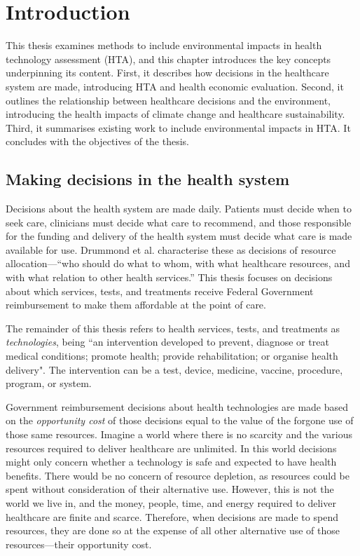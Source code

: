 \chapter{Introduction}
\label{ch-1}
\begin{refsection}
This thesis examines methods to include environmental impacts in health technology assessment (HTA), and this chapter introduces the key concepts underpinning its content. First, it describes how decisions in the healthcare system are made, introducing HTA and health economic evaluation. Second, it outlines the relationship between healthcare decisions and the environment, introducing the health impacts of climate change and healthcare sustainability. Third, it summarises existing work to include environmental impacts in HTA. It concludes with the objectives of the thesis.

\section{Making decisions in the health system}
Decisions about the health system are made daily. Patients must decide when to seek care, clinicians must decide what care to recommend, and those responsible for the funding and delivery of the health system must decide what care is made available for use. Drummond et al. characterise these as decisions of resource allocation—“who should do what to whom, with what healthcare resources, and with what relation to other health services.”\cite{drummond_methods_2015} This thesis focuses on decisions about which services, tests, and treatments receive Federal Government reimbursement to make them affordable at the point of care.

The remainder of this thesis refers to health services, tests, and treatments as \textit{technologies}, being “an intervention developed to prevent, diagnose or treat medical conditions; promote health; provide rehabilitation; or organise health delivery".\cite{orourke_new_2020} The intervention can be a test, device, medicine, vaccine, procedure, program, or system.\cite{orourke_new_2020}

Government reimbursement decisions about health technologies are made based on the \textit{opportunity cost} of those decisions equal to the value of the forgone use of those same resources. Imagine a world where there is no scarcity and the various resources required to deliver healthcare are unlimited. In this world decisions might only concern whether a technology is safe and expected to have health benefits. There would be no concern of resource depletion, as resources could be spent without consideration of their alternative use. However, this is not the world we live in, and the money, people, time, and energy required to deliver healthcare are finite and scarce. Therefore, when decisions are made to spend resources, they are done so at the expense of all other alternative use of those resources—their opportunity cost.


\end{refsection}

